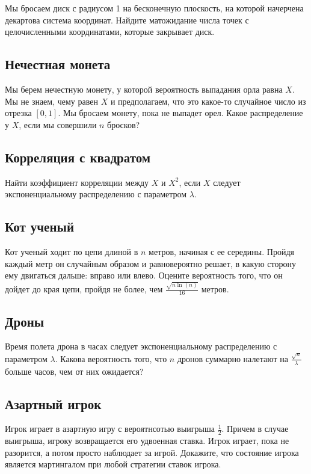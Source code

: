 \documentclass[12pt]{article}
\begin{document}
Мы бросаем диск с радиусом 1 на бесконечную плоскость, на которой начерчена декартова система координат. Найдите матожидание числа точек с целочисленными координатами, которые закрывает диск.



\subsection{Нечестная монета}

Мы берем нечестную монету, у которой вероятность выпадания орла равна $X$. Мы не знаем, чему равен $X$ и предполагаем, что это какое-то случайное число из отрезка $[0, 1]$. Мы бросаем монету, пока не выпадет орел. Какое распределение у $X$, если мы совершили $n$ бросков?



\subsection{Корреляция с квадратом}

Найти коэффициент корреляции между $X$ и $X^2$, если $X$ следует экспоненциальному распределению с параметром $\lambda$.



\subsection{Кот ученый}

Кот ученый ходит по цепи длиной в $n$ метров, начиная с ее середины. Пройдя каждый метр он случайным образом и равновероятно решает, в какую сторону ему двигаться дальше: вправо или влево. Оцените вероятность того, что он дойдет до края цепи, пройдя не более, чем $\frac{\sqrt{n \ln(n)}}{16}$ метров.



\subsection{Дроны}

Время полета дрона в часах следует экспоненциальному распределению с параметром $\lambda$. Какова вероятность того, что $n$ дронов суммарно налетают на $\frac{\sqrt{n}}{\lambda}$ больше часов, чем от них ожидается?



\subsection{Азартный игрок}

Игрок играет в азартную игру с вероятнсотью выигрыша $\frac{1}{2}$. Причем в случае выигрыша, игроку возвращается его удвоенная ставка. Игрок играет, пока не разорится, а потом просто наблюдает за игрой. Докажите, что состояние игрока является мартингалом при любой стратегии ставок игрока.
\end{document}

